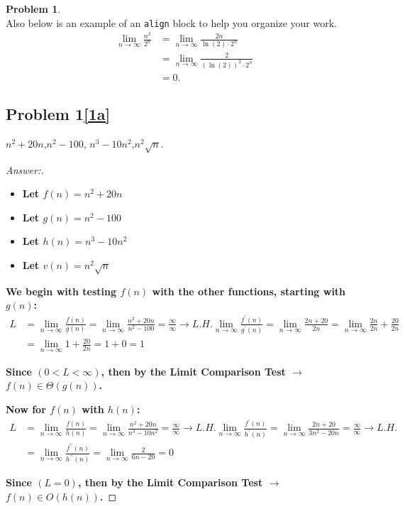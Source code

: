 \documentclass[11pt]{article}
\theoremstyle{definition}
\theoremstyle{definition}
\newtheorem{required}{Problem}
\theoremstyle{definition}
\begin{document}
\begin{required}
\noindent \\ Also below is an example of an \texttt{align} block to help you organize your work.
\begin{align*}
\lim_{n \to \infty} \frac{n^{2}}{2^{n}} &= \lim_{n \to \infty} \frac{2n}{\ln(2) \cdot 2^{n}} \\
&= \lim_{n \to \infty} \frac{2}{(\ln(2))^{2} \cdot 2^{n}} \\
&= 0.
\end{align*}
\newpage
\begin{enumerate} [label=(\alph*)]
\subsection{Problem 1\ref{1a}}
    \item \label{1a} $ n^2+20n$,\qquad  $ n^2-100$, \qquad $n^3-10n^2$,\qquad  $n^2\sqrt{n}$.
    \begin{proof}[Answer:] \

\begin{itemize}
\item \textbf{Let $f(n) = n^2+20n$}
\item \textbf{Let $g(n) = n^2-100$}
\item \textbf{Let $h(n) = n^3-10n^2$}
\item \textbf{Let $v(n) = n^2\sqrt{n}$}
\end{itemize}

\item \textbf{We begin with testing $f(n)$ with the other functions, starting with $g(n)$:}
\begin{align*}
L &= \lim_{n \to \infty} \frac{f(n)}{g(n)} = \lim_{n \to \infty} \frac{n^2+20n}{n^2-100} = \frac{\infty}{\infty} \to L.H. \lim_{n \to \infty} \frac{f^{\prime}(n)}{g^{\prime}(n)} = \lim_{n \to \infty} \frac{2n+20}{2n} = \lim_{n \to \infty} \frac{2n}{2n} + \frac{20}{2n} \\
&= \lim_{n \to \infty} 1 +  \frac{20}{2n} = 1 + 0 = 1
\end{align*}
\item \textbf{Since $(0 < L < \infty)$, then by the Limit Comparison Test $\to$ $f(n) \in \Theta(g(n))$.}\\

\item \textbf{Now for $f(n)$ with $h(n)$:}
\begin{align*}
L &= \lim_{n \to \infty} \frac{f(n)}{h(n)} = \lim_{n \to \infty} \frac{n^2+20n}{n^3-10n^2} =  \frac{\infty}{\infty} \to L.H. \lim_{n \to \infty} \frac{f^{\prime}(n)}{h^{\prime}(n)} = \lim_{n \to \infty} \frac{2n+20}{3n^2-20n} =  \frac{\infty}{\infty} \to L.H. \\
&= \lim_{n \to \infty} \frac{f^{\prime\prime}(n)}{h^{\prime\prime}(n)} = \lim_{n \to \infty} \frac{2}{6n-20} = 0
\end{align*}
\item \textbf{Since $(L = 0)$, then by the Limit Comparison Test $\to$ $f(n) \in O(h(n))$.}


\end{proof}
\end{enumerate}
\end{required}
\end{document}

